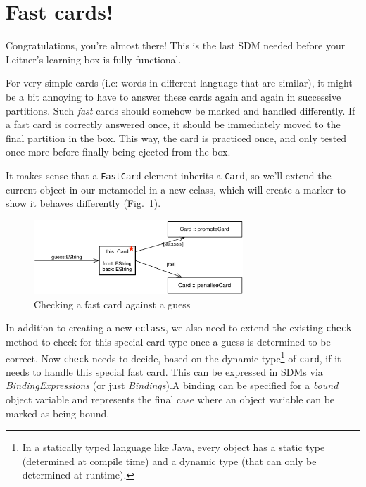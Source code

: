 \newpage
\section{Fast cards!}
\genHeader
\hypertarget{sec:fastCard}{}

Congratulations, you're almost there! This is the last SDM needed before your Leitner's learning box is fully functional.

For very simple cards (i.e: words in different language that are similar), it might be a bit annoying to have to answer these cards again and again in
successive partitions. Such \emph{fast} cards should somehow be marked and handled differently. If a fast card is correctly answered once, it should be
immediately moved to the final partition in the box. This way, the card is practiced once, and only tested once more before finally being ejected from the
box.

It makes sense that a \texttt{FastCard} element inherits a \texttt{Card}, so we'll extend the current object in our metamodel in a new eclass, which will create
a marker to show it behaves differently (Fig.~\ref{fig:goal_fastCard}).

\begin{figure}[htbp]
	\centering
    \includegraphics[width=0.7\textwidth]{goal_fastCard}
	\caption{Checking a fast card against a guess}
	\label{fig:goal_fastCard}
\end{figure}
\FloatBarrier

In addition to creating a new \texttt{eclass}, we also need to extend the existing \texttt{check} method to check for this special card type once a guess is
determined to be correct. Now \texttt{check} needs to decide, based on the dynamic type\footnote{In a statically typed language like Java, every
object has a static type (determined at compile time) and a dynamic type (that can only be determined at runtime).} of \texttt{card}, if it needs to handle this special fast card. This
can be expressed in SDMs via \emph{BindingExpressions} (or just \emph{Bindings}).A binding can be specified for a \emph{bound} object variable
and represents the final case where an object variable can be marked as being bound.

